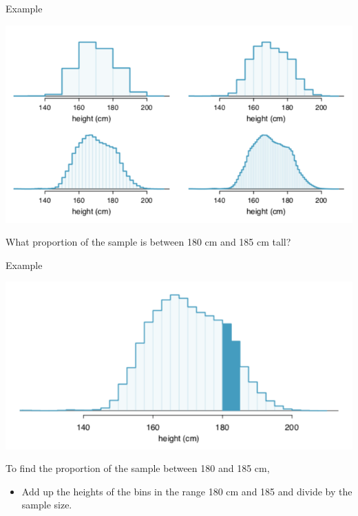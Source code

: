 \begin{frame}{Example}
    \begin{center}
        \includegraphics[scale=0.4]{images/hists.png}
    \end{center}
    What proportion of the sample is between 180 cm and 185 cm tall?
\end{frame}

\begin{frame}{Example}
    \begin{center}
        \includegraphics[scale=0.4]{images/heighthist.png}
    \end{center}
    \vspace{-12pt}To find the proportion of the sample between 180 and 185 cm,
    \begin{itemize}
        \item Add up the heights of the bins in the range 180 cm and 185 and divide by the sample size. 
    \end{itemize}
\end{frame}

